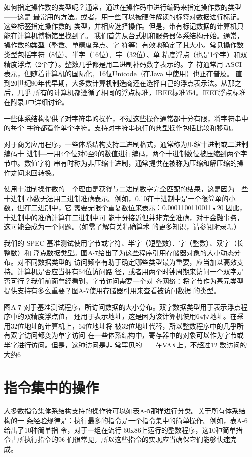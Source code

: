 如何指定操作数的类型呢？通常，通过在操作码中进行编码来指定操作数的类型——这是
最常用的方法。或者，用一些可以被硬件解读的标签对数据进行标记。这些标签指定操作数的
类型，并相应选择操作。但是，带有标记数据的计算机只能在计算机博物馆里找到了。
我们首先从台式机和服务器体系结构开始。通常，操作数的类型（整数、单精度浮点、字
符等）有效地确定了其大小。常见操作数类型包括字符（8位）、半字（16位）、宇（32位）、单
精度浮点（也是1个字）和双精度浮点（2个字）。整数几乎都是用二进制补码数字表示的。字
符通常用 ASCI表示，但随着计算机的国际化，16位Unicode（在Java 中使用）也正在普及。
直到20世纪80年代早期，大多数计算机制造商还在选择自己的浮点表示法。从那之后，几乎
所有的计算机都遵循了相同的浮点标准，IBEE标准754。IEEE浮点标准在附录J中详细讨论。

一些体系结构提供了对字符串的操作，不过这些操作通常都十分有限，将字符串中的每个
字符都看作单个字符。支持对字符串执行的典型操作包括比较和移动。

对于商务应用程序，一些体系结构支持二进制格式，通常称为压缩十进制或二进制编码十
进制—一用4个位对0至9的数值进行编码，两个十进制数位被压缩到两个字节中。数值字符
串有时称为非压缩十进制，通常提供在被称为压缩和解压缩的操作之间来回转换。

使用十进制操作数的一个理由是获得与二进制数字完全匹配的结果，这是因为一些十进制
小数无法用二进制准确表示。例如，0.10在十进制中是一个很简单的小数，但在二进制中，它
需要无限个重复数位来表示：0.0001100110011•20 因此，十进制中的准确计算在二进制中可
能十分接近但并非完全准确，对于金融事务，这可能会成为一个问题。（如需了解有关精确算术
的更多知识，请参阅附录J。）

我们的 SPEC 基准测试使用字节或字符、半字（短整数）、字（整数）、双字（长整数）和
浮点数据类型。图A-7给出了为这些程序引用存储器对象的大小动态分布。对不同数据类型的
访问频率有助于确定哪些类型最为重要，应当加以高效支持。计算机是否应当拥有64位访问路
径，或者用两个时钟周期来访问一个双字是否可行？我们前面曾经看到，字节访问需要一个对
齐网络：将字节作为基元类型提供支持有多么重要？图A-7使用存储器引用来查看被访问数据
的类型。

图A-7 对于基准测试程序，所访问数据的大小分布。双字数据类型用于表示浮点程序中的双精度浮点值，
还用于表示地址，这是因为该计算机使用64位地址。在采用32位地址的计算机上，64位地址将
被32位地址代替，所以整数程序中的几乎所有双字访问都变为单字访问
在一些体系结构中，寄存器中的对象可以作为字节或半字进行访问。但是，这种访问是非
常罕见的——在VAX上，不超过12%
数访问的大约6%

\section{指令集中的操作}
大多数指令集体系结构支持的操作符可以如表A-5那样进行分类。关于所有体系结构的一
条经验规律是：执行最多的指令是一个指令集中的简单操作。例如，表A-6给出了10种简单指
令，对于一组在流行 80x86上运行的整数程序，这10种简单措令占所执行指令的96%
们很常见，所以这些指令的实现应当确保它们能够快速完成。

